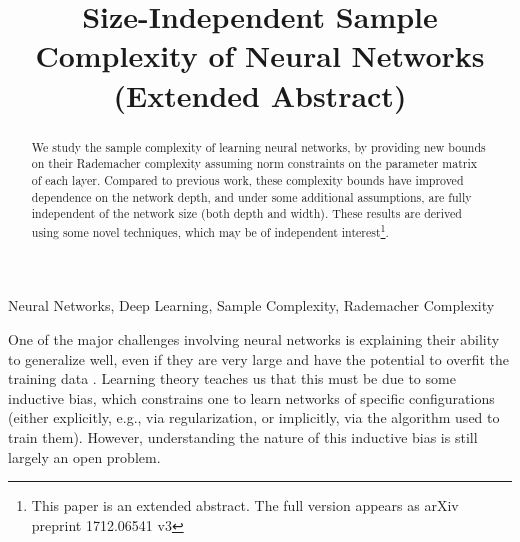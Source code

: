 \documentclass[final,12pt]{colt2018} %
\title[Size-Independent Sample Complexity of Neural Networks]{Size-Independent 
Sample Complexity of Neural Networks\\(Extended Abstract)
}
\begin{document}
	
	\maketitle
	
	\begin{abstract}
	We study the sample complexity of learning neural networks, by 
	providing new bounds on their Rademacher complexity assuming norm 
	constraints on the parameter matrix of each layer. Compared to previous 
	work, these complexity bounds have improved dependence on the network 
	depth, and under some additional assumptions, are fully independent of the 
	network size (both depth and width). These results are derived using some 
	novel techniques, which may be of independent interest\footnote{This paper 
	is an extended abstract. The full version appears as arXiv preprint 		
	1712.06541 v3}.
\end{abstract}

\begin{keywords}
	Neural Networks, Deep Learning, Sample Complexity, Rademacher Complexity
\end{keywords}
	
\vskip 1cm

One of the major challenges involving neural networks is explaining their 
ability to generalize well, even if they are very large and have the 
potential to overfit the training data 
\citep{neyshabur2014search,zhang2016understanding}. 
Learning theory teaches us that this must be due to some inductive bias, 
which constrains one to learn networks of specific configurations (either 
explicitly, e.g., via regularization, or implicitly, via the algorithm used to 
train them). However, understanding the nature of 
this inductive bias is still largely an open problem. 
\end{document}
